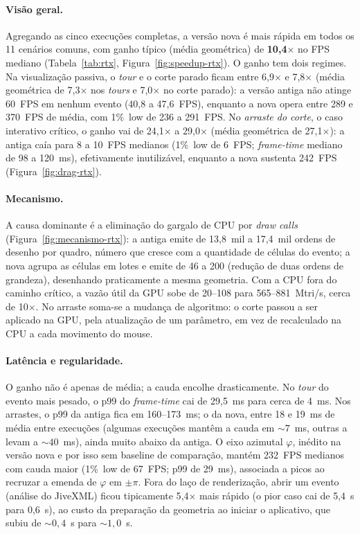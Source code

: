 \documentclass[11pt,a4paper]{article}
\begin{document}
\paragraph{Vis\~ao geral.}
Agregando as cinco execu\c{c}\~oes completas, a vers\~ao nova \'e mais r\'apida em todos os 11
cen\'arios comuns, com ganho t\'ipico (m\'edia geom\'etrica) de \textbf{10{,}4$\times$} no FPS
mediano (Tabela~\ref{tab:rtx}, Figura~\ref{fig:speedup-rtx}). O ganho tem dois regimes. Na
visualiza\c{c}\~ao passiva, o \emph{tour} e o corte parado ficam entre 6{,}9$\times$ e
7{,}8$\times$ (m\'edia geom\'etrica de 7{,}3$\times$ nos \emph{tours} e 7{,}0$\times$ no corte
parado): a vers\~ao antiga n\~ao atinge 60~FPS em nenhum evento (40{,}8 a 47{,}6~FPS), enquanto
a nova opera entre 289 e 370~FPS de m\'edia, com 1\%~low de 236 a 291~FPS. No \emph{arraste do
corte}, o caso interativo cr\'itico, o ganho vai de 24{,}1$\times$ a 29{,}0$\times$ (m\'edia
geom\'etrica de 27{,}1$\times$): a antiga ca\'ia para 8 a 10~FPS medianos (1\%~low de 6~FPS;
\emph{frame-time} mediano de 98 a 120~ms), efetivamente inutiliz\'avel, enquanto a nova sustenta
242~FPS (Figura~\ref{fig:drag-rtx}).

\paragraph{Mecanismo.}
A causa dominante \'e a elimina\c{c}\~ao do gargalo de CPU por \emph{draw calls}
(Figura~\ref{fig:mecanismo-rtx}): a antiga emite de 13{,}8~mil a 17{,}4~mil ordens de desenho
por quadro, n\'umero que cresce com a quantidade de c\'elulas do evento; a nova agrupa as
c\'elulas em lotes e emite de 46 a 200 (redu\c{c}\~ao de duas ordens de grandeza), desenhando
praticamente a mesma geometria. Com a CPU fora do caminho cr\'itico, a vaz\~ao \'util da GPU
sobe de 20--108 para 565--881~Mtri/s, cerca de 10$\times$. No arraste soma-se a mudan\c{c}a de
algoritmo: o corte passou a ser aplicado na GPU, pela atualiza\c{c}\~ao de um par\^ametro, em
vez de recalculado na CPU a cada movimento do mouse.

\paragraph{Lat\^encia e regularidade.}
O ganho n\~ao \'e apenas de m\'edia; a cauda encolhe drasticamente. No \emph{tour} do evento
mais pesado, o p99 do \emph{frame-time} cai de 29{,}5~ms para cerca de 4~ms. Nos arrastes, o p99
da antiga fica em 160--173~ms; o da nova, entre 18 e 19~ms de m\'edia entre execu\c{c}\~oes
(algumas execu\c{c}\~oes mant\^em a cauda em ${\sim}7$~ms, outras a levam a ${\sim}40$~ms),
ainda muito abaixo da antiga. O eixo azimutal $\varphi$, in\'edito na vers\~ao nova e por isso
sem baseline de compara\c{c}\~ao, mant\'em 232~FPS medianos com cauda maior (1\%~low de 67~FPS;
p99 de 29~ms), associada a picos ao recruzar a emenda de $\varphi$ em $\pm\pi$. Fora do la\c{c}o
de renderiza\c{c}\~ao, abrir um evento (an\'alise do JiveXML) ficou tipicamente 5{,}4$\times$
mais r\'apido (o pior caso cai de 5{,}4~s para 0{,}6~s), ao custo da prepara\c{c}\~ao da
geometria ao iniciar o aplicativo, que subiu de ${\sim}0{,}4$~s para ${\sim}1{,}0$~s.
\end{document}
